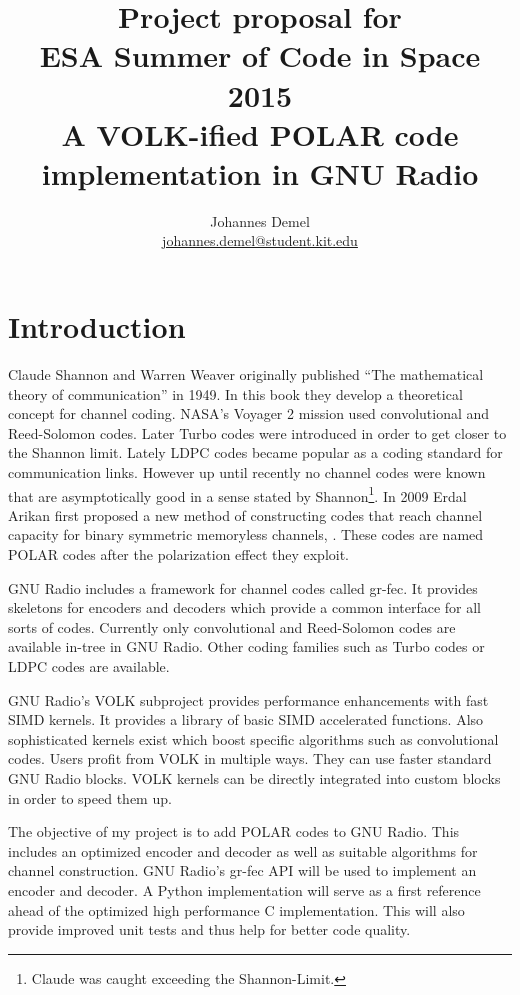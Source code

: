 \documentclass[a4paper,12pt]{scrartcl}
\title{Project proposal for\\
\ac{ESA} Summer of Code in Space 2015\\
A VOLK-ified POLAR code implementation in GNU Radio
}
\author{Johannes Demel\\\href{mailto:johannes.demel@student.kit.edu}{johannes.demel@student.kit.edu}}
\def\CC{{C\nolinebreak[4]\hspace{-.05em}\raisebox{.4ex}{\tiny\textbf{++}}}}
\begin{document}
\maketitle

\tableofcontents
\newpage

\section{Introduction}
Claude Shannon and Warren Weaver originally published ``The mathematical theory of communication'' \cite{shannon1998} in 1949.
In this book they develop a theoretical concept for channel coding.
\ac{NASA}'s Voyager 2 mission used convolutional and Reed-Solomon codes.
Later Turbo codes were introduced in order to get closer to the Shannon limit.
Lately \ac{LDPC} codes became popular as a coding standard for communication links.
However up until recently no channel codes were known that are asymptotically good in a sense stated by Shannon\footnote{Claude was caught exceeding the Shannon-Limit.}.
In 2009 Erdal Arikan first proposed a new method of constructing codes that reach channel capacity for binary symmetric memoryless channels, \cite{polar:arikan09}.
These codes are named POLAR codes after the polarization effect they exploit.

GNU Radio includes a framework for channel codes called gr-fec.
It provides skeletons for encoders and decoders which provide a common interface for all sorts of codes.
Currently only convolutional and Reed-Solomon codes are available in-tree in GNU Radio.
Other coding families such as Turbo codes or \ac{LDPC} codes are available.

GNU Radio's \acs{VOLK} subproject provides performance enhancements with fast \ac{SIMD} kernels.
It provides a library of basic \ac{SIMD} accelerated functions.
Also sophisticated kernels exist which boost specific algorithms such as convolutional codes.
Users profit from \ac{VOLK} in multiple ways.
They can use faster standard GNU Radio blocks.
\ac{VOLK} kernels can be directly integrated into custom blocks in order to speed them up.

The objective of my project is to add POLAR codes to GNU Radio.
This includes an optimized encoder and decoder as well as suitable algorithms for channel construction.
GNU Radio's gr-fec API will be used to implement an encoder and decoder. 
A Python implementation will serve as a first reference ahead of the optimized high performance \CC{} implementation.
This will also provide improved unit tests and thus help for better code quality.
\end{document}
